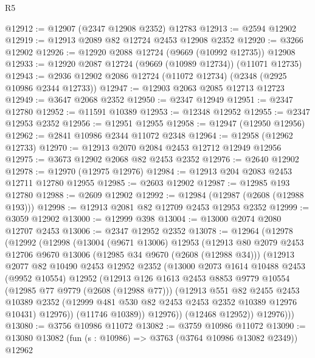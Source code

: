 \begin{lexlean}{R5}
\begin{coremodule}
@12912 := @12907 (@2347 @12908 @2352) @12783
@12913 := @2594 @12902
@12919 := @12913 @2089 @82 @12724 @2453 @12908 @2352
@12920 := @3266 @12902
@12926 := @12920 @2088 @12724 (@9669 (@10992 @12735)) @12908
@12933 := @12920 @2087 @12724 (@9669 (@10989 @12734)) (@11071 @12735)
@12943 := @2936 @12902 @2086 @12724 (@11072 @12734) (@2348 (@2925 @10986 @2344 @12733))
@12947 := @12903 @2063 @2085 @12713 @12723
@12949 := @3647 @2068 @2352
@12950 := @2347 @12949
@12951 := @2347 @12780
@12952 := @11591 @10389
@12953 := @12348 @12952
@12955 := @2347 @12953 @2352
@12956 := @12951 @12955
@12958 := @12947 (@12950 @12956)
@12962 := @2841 @10986 @2344 @11072 @2348
@12964 := @12958 (@12962 @12733)
@12970 := @12913 @2070 @2084 @2453 @12712 @12949 @12956
@12975 := @3673 @12902 @2068 @82 @2453 @2352
@12976 := @2640 @12902
@12978 := @12970 (@12975 @12976)
@12984 := @12913 @204 @2083 @2453 @12711 @12780 @12955
@12985 := @2603 @12902
@12987 := @12985 @193 @12780
@12988 := @2609 @12902
@12992 := @12984 (@12987 (@2608 (@12988 @193)))
@12998 := @12913 @2081 @82 @12709 @2453 @12953 @2352
@12999 := @3059 @12902
@13000 := @12999 @398
@13004 := @13000 @2074 @2080 @12707 @2453
@13006 := @2347 @12952 @2352
@13078 := @12964
    (@12978
      (@12992
        (@12998
          (@13004
            (@9671 @13006)
            @12953
            (@12913
              @80
              @2079
              @2453
              @12706
              @9670
              @13006
              (@12985 @34 @9670 (@2608 (@12988 @34)))
              (@12913
                @2077
                @82
                @10490
                @2453
                @12952
                @2352
                (@13000
                  @2073
                  @1614
                  @10488
                  @2453
                  (@9952 @10554)
                  @12952
                  (@12913
                    @126
                    @1613
                    @2453
                    @8853
                    @9779
                    @10554
                    (@12985 @77 @9779 (@2608 (@12988 @77)))
                    (@12913
                      @551
                      @82
                      @2455
                      @2453
                      @10389
                      @2352
                      (@12999 @481 @530 @82 @2453 @2453 @2352 @10389 @12976 @10431)
                      @12976))
                  (@11746 @10389))
                @12976))
            (@12468 @12952))
          @12976)))
@13080 := @3756 @10986 @11072
@13082 := @3759 @10986 @11072
@13090 := @13080 @13082 (fun (s : @10986) => @3763 (@3764 @10986 @13082 @2349)) @12962

\end{coremodule}
\end{lexlean}

